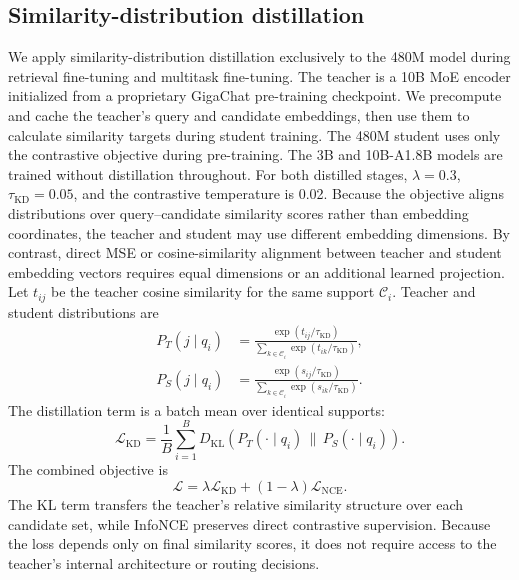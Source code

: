\documentclass[11pt]{article}
\begin{document}
\subsection{Similarity-distribution distillation}
\label{sec:distill}

We apply similarity-distribution distillation exclusively to the 480M model during retrieval fine-tuning and multitask fine-tuning.
The teacher is a 10B MoE encoder initialized from a proprietary GigaChat pre-training checkpoint.
We precompute and cache the teacher's query and candidate embeddings, then use them to calculate similarity targets during student training.
The 480M student uses only the contrastive objective during pre-training.
The 3B and 10B-A1.8B models are trained without distillation throughout.
For both distilled stages, $\lambda=0.3$, $\tau_{\mathrm{KD}}=0.05$, and the contrastive temperature is 0.02.
Because the objective aligns distributions over query--candidate similarity scores rather than embedding coordinates, the teacher and student may use different embedding dimensions.
By contrast, direct MSE or cosine-similarity alignment between teacher and student embedding vectors requires equal dimensions or an additional learned projection.
Let $t_{ij}$ be the teacher cosine similarity for the same support $\mathcal{C}_i$.
Teacher and student distributions are
\begin{align}
P_T(j\mid q_i) &= \frac{\exp(t_{ij}/\tau_{\mathrm{KD}})}
 {\sum_{k\in\mathcal{C}_i}\exp(t_{ik}/\tau_{\mathrm{KD}})}, \\
P_S(j\mid q_i) &= \frac{\exp(s_{ij}/\tau_{\mathrm{KD}})}
 {\sum_{k\in\mathcal{C}_i}\exp(s_{ik}/\tau_{\mathrm{KD}})}.
\end{align}
The distillation term is a batch mean over identical supports:
\begin{equation}
  \mathcal{L}_{\mathrm{KD}} = \frac{1}{B}\sum_{i=1}^{B}
  D_{\mathrm{KL}}\!\left(P_T(\cdot\mid q_i)\,\|\,P_S(\cdot\mid q_i)\right).
  \label{eq:kd}
\end{equation}
The combined objective is
\begin{equation}
  \mathcal{L}=\lambda\mathcal{L}_{\mathrm{KD}}
  +(1-\lambda)\mathcal{L}_{\mathrm{NCE}}.
  \label{eq:combined}
\end{equation}
The KL term transfers the teacher's relative similarity structure over each candidate set, while InfoNCE preserves direct contrastive supervision.
Because the loss depends only on final similarity scores, it does not require access to the teacher's internal architecture or routing decisions.
\end{document}
